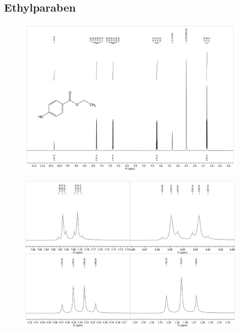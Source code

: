     \subsection{Ethylparaben}
    \begin{figure}[H] \centering
        \includegraphics[width=\textwidth]{billeder/ethylnmr}
        \caption{}
    \end{figure}

    \begin{figure}[H] \centering
        \includegraphics[width=\textwidth]{billeder/ethylpeaks}
        \caption{}
    \end{figure} 

